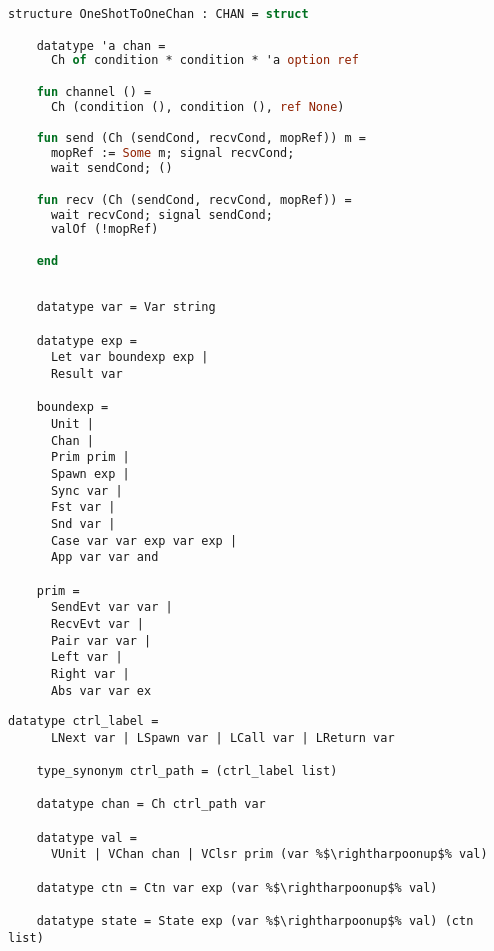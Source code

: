 \documentclass{article}
\begin{document}
\begin{lstlisting}[language=ML, style=codestyle1]
  structure OneShotToOneChan : CHAN = struct

    datatype 'a chan =
      Ch of condition * condition * 'a option ref

    fun channel () =
      Ch (condition (), condition (), ref None)

    fun send (Ch (sendCond, recvCond, mopRef)) m =
      mopRef := Some m; signal recvCond;  
      wait sendCond; ()

    fun recv (Ch (sendCond, recvCond, mopRef)) =
      wait recvCond; signal sendCond;
      valOf (!mopRef)

    end
  \end{lstlisting}

  \begin{lstlisting}[style=codestyle1]

    datatype var = Var string

    datatype exp = 
      Let var boundexp exp |
      Result var

    boundexp =
      Unit |
      Chan |
      Prim prim |
      Spawn exp |
      Sync var |
      Fst var |
      Snd var |
      Case var var exp var exp |
      App var var and

    prim = 
      SendEvt var var |
      RecvEvt var |
      Pair var var |
      Left var |
      Right var |
      Abs var var ex

  \end{lstlisting}


  \begin{lstlisting}[style=codestyle1, escapechar=\%]
    datatype ctrl_label = 
      LNext var | LSpawn var | LCall var | LReturn var

    type_synonym ctrl_path = (ctrl_label list)

    datatype chan = Ch ctrl_path var

    datatype val = 
      VUnit | VChan chan | VClsr prim (var %$\rightharpoonup$% val)

    datatype ctn = Ctn var exp (var %$\rightharpoonup$% val)  

    datatype state = State exp (var %$\rightharpoonup$% val) (ctn list) 

    \end{lstlisting}
\end{document}

